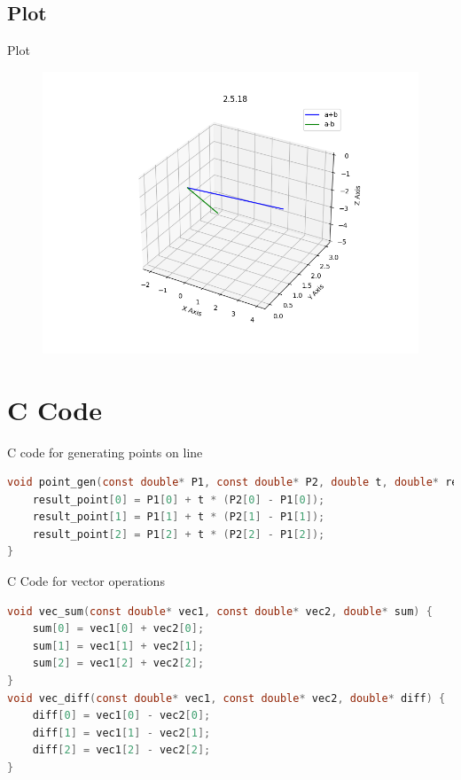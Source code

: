 \documentclass{beamer}
\theoremstyle{remark}
\numberwithin{equation}{section}
\begin{document}
\subsection{Plot}
\begin{frame}{Plot}
 \begin{figure}[H]
    \centering
    \includegraphics{../figs/plot.png}
    \caption*{}
    \label{fig:plot}
\end{figure}
\end{frame}

\section{C Code}
\begin{frame}[fragile]{C code for generating points on line}
\begin{lstlisting}[language=C]
 void point_gen(const double* P1, const double* P2, double t, double* result_point) {
    result_point[0] = P1[0] + t * (P2[0] - P1[0]);
    result_point[1] = P1[1] + t * (P2[1] - P1[1]);
    result_point[2] = P1[2] + t * (P2[2] - P1[2]);
}
\end{lstlisting}
\end{frame}
\begin{frame}[fragile]{C Code for vector operations}
 \begin{lstlisting}[language=C]
  void vec_sum(const double* vec1, const double* vec2, double* sum) {
    sum[0] = vec1[0] + vec2[0];
    sum[1] = vec1[1] + vec2[1];
    sum[2] = vec1[2] + vec2[2];
}
void vec_diff(const double* vec1, const double* vec2, double* diff) {
    diff[0] = vec1[0] - vec2[0];
    diff[1] = vec1[1] - vec2[1];
    diff[2] = vec1[2] - vec2[2];
}
 \end{lstlisting}
\end{frame}
\end{document}
